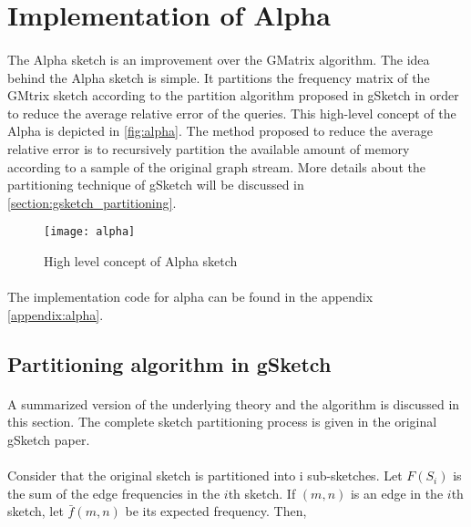\section{Implementation of Alpha}

\paragraph{}
The Alpha sketch is an improvement over the GMatrix algorithm. The idea behind the Alpha sketch is simple. It partitions the frequency matrix of the GMtrix sketch according to the partition algorithm proposed in gSketch in order to reduce the average relative error of the queries. This high-level concept of the Alpha is depicted in \autoref{fig:alpha}. The method proposed to reduce the average relative error is to recursively partition the available amount of memory according to a sample of the original graph stream. More details about the partitioning technique of gSketch will be discussed in \autoref{section:gsketch_partitioning}.

\begin{figure}[H]
    \centering \texttt{[image: alpha]}
    \caption{High level concept of Alpha sketch}
    \label{fig:alpha}
\end{figure}

\paragraph{}
The implementation code for alpha can be found in the appendix \autoref{appendix:alpha}.

\subsection{Partitioning algorithm in gSketch\cite{zhao_gsketch:_2011}}
\label{section:gsketch_partitioning}

\paragraph{}
A summarized version of the underlying theory and the algorithm is discussed in this section. The complete sketch partitioning process is given in the original gSketch paper.

\paragraph{}
Consider that the original sketch is partitioned into i sub-sketches. Let \(F(S_i)\) is the sum of the edge frequencies in the \(i\)th sketch. If \((m,n)\) is an edge in the \(i\)th sketch, let \(\bar{f}(m,n)\) be its expected frequency. Then,

